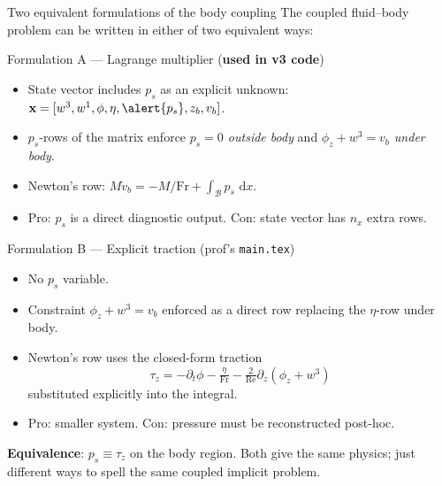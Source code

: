 \documentclass[aspectratio=169, 10pt]{beamer}
\newcommand{\Fr}{\mathrm{Fr}}
\newcommand{\Rey}{\mathrm{Re}}
\newcommand{\xx}{\mathbf{x}}
\newcommand{\dd}{\,\mathrm{d}}
\begin{document}
\begin{frame}{Two equivalent formulations of the body coupling}
\small
The coupled fluid--body problem can be written in either of two equivalent ways:

\begin{block}{Formulation A — Lagrange multiplier (\textbf{used in v3 code})}
\begin{itemize}
\item State vector includes $p_s$ as an explicit unknown: $\xx = [w^3, w^1, \phi, \eta, \alert{p_s}, z_b, v_b]$.
\item $p_s$-rows of the matrix enforce \textit{$p_s = 0$ outside body} and \textit{$\phi_z + w^3 = v_b$ under body}.
\item Newton's row: $M\dot v_b = -M/\Fr + \int_\mathcal{B} p_s\,\dd x$.
\item \textcolor{primarycol}{Pro: $p_s$ is a direct diagnostic output.} \textcolor{accentcol}{Con: state vector has $n_x$ extra rows.}
\end{itemize}
\end{block}

\begin{block}{Formulation B — Explicit traction (prof's \texttt{main.tex})}
\begin{itemize}
\item No $p_s$ variable.
\item Constraint $\phi_z + w^3 = v_b$ enforced as a direct row replacing the $\eta$-row under body.
\item Newton's row uses the closed-form traction
\[
\tau_z = -\partial_t\phi - \tfrac{\eta}{\Fr} - \tfrac{2}{\Rey}\partial_z(\phi_z + w^3)
\]
substituted explicitly into the integral.
\item \textcolor{primarycol}{Pro: smaller system.} \textcolor{accentcol}{Con: pressure must be reconstructed post-hoc.}
\end{itemize}
\end{block}

\vspace{0.3em}
\small\textbf{Equivalence}: $p_s \equiv \tau_z$ on the body region. Both give the same physics; just different ways to spell the same coupled implicit problem.
\end{frame}
\end{document}
